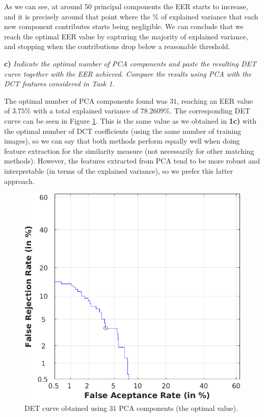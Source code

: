 \documentclass[11pt]{article}
\begin{document}
As we can see, at around 50 principal components the EER starts to increase, and it is precisely around that point where the $\%$ of explained variance that each new component contributes starts being negligible. We can conclude that we reach the optimal EER value by capturing the majority of explained variance, and stopping when the contributions drop below a reasonable threshold.

\textbf{c)} \textit{Indicate the optimal number of PCA components and paste the resulting DET curve together with the EER achieved. Compare the results using PCA with the DCT features considered in Task 1.}

The optimal number of PCA components found was $31$, reaching an EER value of $3.75\%$ with a total explained variance of $78.2609\%$. The corresponding DET curve can be seen in Figure \ref{fig:ex2c}. This is the same value as we obtained in \textbf{1c)} with the optimal number of DCT coefficients (using the same number of training images), so we can say that both methods perform equally well when doing feature extraction for the similarity measure (not necessarily for other matching methods). However, the features extracted from PCA tend to be more robust and interpretable (in terms of the explained variance), so we prefer this latter approach.

\begin{figure}[h!]
  \centering
    \includegraphics[scale=0.55]{img/2c_det}
    \caption{DET curve obtained using 31 PCA components (the optimal value).}
    \label{fig:ex2c}
\end{figure}
\end{document}
